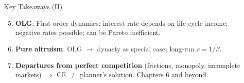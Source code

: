 \documentclass[blue]{beamer}
\begin{document}
\begin{frame}{Key Takeaways (II)}
	\begin{enumerate}
		\setcounter{enumi}{4}
		\item \textbf{OLG}: First-order dynamics; interest rate depends on life-cycle income; negative rates possible; can be Pareto inefficient.
		
		\item \textbf{Pure altruism}: OLG $\to$ dynasty as special case; long-run $r = 1/\tilde{\beta}$.
		
		\item \textbf{Departures from perfect competition} (frictions, monopoly, incomplete markets) $\Rightarrow$ CE $\neq$ planner's solution. Chapters 6 and beyond.
	\end{enumerate}
\end{frame}
\end{document}
